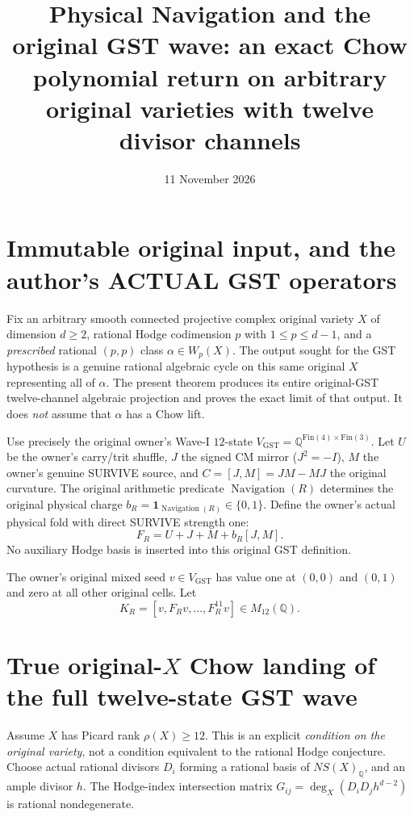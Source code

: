 \documentclass[11pt]{article}
\title{Physical Navigation and the original GST wave: an exact Chow polynomial return on arbitrary original varieties with twelve divisor channels}
\date{11 November 2026}
\begin{document}
\maketitle

\section{Immutable original input, and the author's ACTUAL GST operators}

Fix an arbitrary smooth connected projective complex original variety
$X$ of dimension $d\ge2$, rational Hodge codimension $p$ with
$1\le p\le d-1$, and a \emph{prescribed} rational $(p,p)$ class
$\alpha\in W_p(X)$. The output sought for the GST hypothesis is
a genuine rational algebraic cycle on this same original $X$
representing all of $\alpha$. The present theorem produces its
entire original-GST twelve-channel algebraic projection and proves
the exact limit of that output. It does \emph{not} assume that
$\alpha$ has a Chow lift.

Use precisely the original owner's Wave-I $12$-state
$V_{\mathrm{GST}}=\mathbb Q^{\mathrm{Fin}(4)\times\mathrm{Fin}(3)}$.
Let $U$ be the owner's carry/trit shuffle,
$J$ the signed CM mirror ($J^2=-I$),
$M$ the owner's genuine SURVIVE source, and
$C=[J,M]=JM-MJ$ the original curvature.
The original arithmetic predicate $\operatorname{Navigation}(R)$
determines the original physical charge
$b_R=\mathbf1_{\operatorname{Navigation}(R)}\in\{0,1\}$.
Define the owner's actual physical fold with direct SURVIVE strength one:
\[
F_R=U+J+M+b_R[J,M].
\]
No auxiliary Hodge basis is inserted into this original GST definition.

The owner's original mixed seed $v\in V_{\mathrm{GST}}$
has value one at $(0,0)$ and $(0,1)$ and zero
at all other original cells. Let
\[
K_R=[v,F_Rv,\ldots,F_R^{11}v]\in M_{12}(\mathbb Q).
\]

\section{True original-$X$ Chow landing of the full twelve-state GST wave}

Assume $X$ has Picard rank $\rho(X)\ge12$.
This is an explicit \emph{condition on the original variety},
not a condition equivalent to the rational Hodge conjecture.
Choose actual rational divisors $D_i$ forming a rational basis
of $NS(X)_\mathbb Q$, and an ample divisor $h$.
The Hodge-index intersection matrix
$G_{ij}=\deg_X(D_iD_jh^{d-2})$ is rational nondegenerate.
\end{document}

